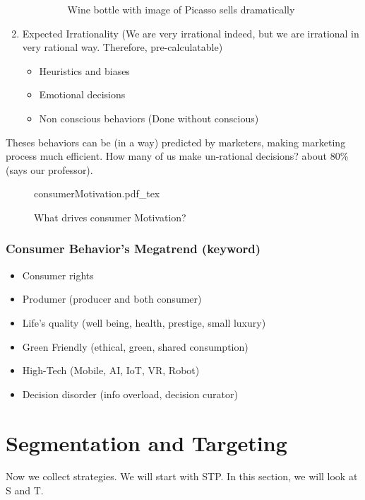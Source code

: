 \documentclass[12pt]{article}
\begin{document}
\begin{enumerate}
\begin{itemize}
\begin{figure}[H]
	\caption{Wine bottle with image of Picasso sells dramatically}
	\label{}
\end{figure}

	\end{itemize}
	\item Expected Irrationality (We are very irrational indeed, but we are irrational in very rational way. Therefore, pre-calculatable)
	\begin{itemize}
		\item Heuristics and biases
		\item  Emotional decisions
		\item Non conscious behaviors (Done without conscious)
	\end{itemize}
\end{enumerate}

Theses behaviors can be (in a way) predicted by marketers, making marketing process much efficient.
How many of us make un-rational decisions? about 80\%(says our professor).

\begin{figure}[H]
	\centering
	\def\svgwidth{\columnwidth}
	{consumerMotivation.pdf_tex}
	\caption{What drives consumer Motivation?}
	\label{fig:consumerMotivation}
\end{figure}

\subsubsection{Consumer Behavior's Megatrend (keyword)}
\begin{itemize}
	\item Consumer rights
	\item Produmer (producer and both consumer)
	\item Life's quality (well being, health, prestige, small luxury)
	\item Green Friendly (ethical, green, shared consumption)
	\item High-Tech (Mobile, AI, IoT, VR, Robot)
	\item Decision disorder (info overload, decision curator)
\end{itemize}

\section{Segmentation and Targeting}

Now we collect strategies. We will start with STP. In this section, we will look at S and T.
\end{document}
